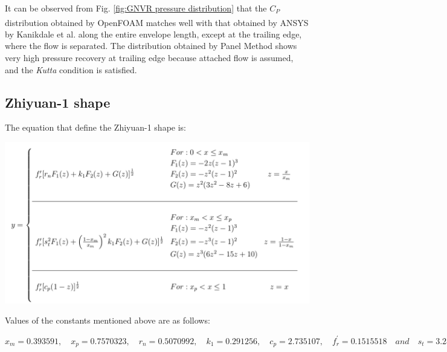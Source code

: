 It can be observed from Fig. \ref{fig:GNVR pressure distribution} that the $C_{P}$ distribution obtained by OpenFOAM\textsuperscript{\textregistered} matches well with that obtained by ANSYS\textsuperscript{\textregistered} by Kanikdale et al. \cite{Kanikdale} along the entire envelope length, except at the trailing edge, where the flow is separated. The distribution obtained by Panel Method \cite{srilata} shows very high pressure recovery at trailing edge because attached flow is assumed, and the \textit{Kutta} condition is satisfied.

\subsection{Zhiyuan-1 shape \cite{zhiyuan}}

The equation that define the Zhiyuan-1 shape is:
\begin{center}
	\includegraphics[width= 400 pt]{rnd/zhiyuan_equations.png}
\end{center}
Values of the constants mentioned above are as follows:

$ x_{m} = 0.393591, \quad x_{p} = 0.7570323,\quad r_{n} = 0.5070992,\quad k_{1} = 0.291256,\quad c_{p} = 2.735107,\quad f_{r}^{'} = 0.1515518 \quad and \quad  s_{t} = 3.236105 $


